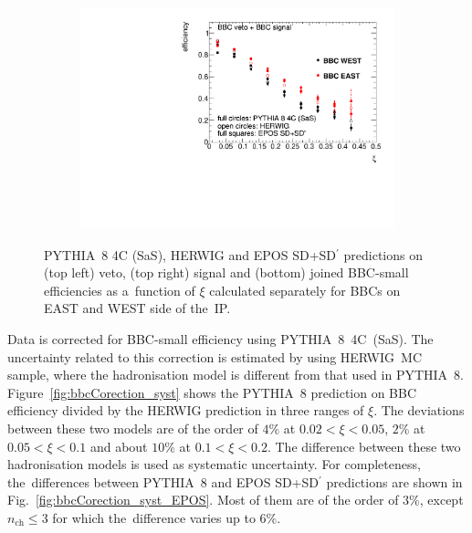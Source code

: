 \begin{figure}[t!]
\begin{subfigure}{.45\textwidth}
	\end{subfigure}
	\begin{subfigure}{.45\textwidth}
		\includegraphics[width=\textwidth,page=1]{chapters/chrgSTAR/img/bbcCorrection/xiSD_bbc.pdf}
	\end{subfigure}
	\begin{minipage}{.45\textwidth}
		\caption{PYTHIA~8 4C (SaS), HERWIG and EPOS SD+SD$^\prime$ predictions on  (top left) veto, (top right) signal and (bottom) joined BBC-small efficiencies  as a~function of  $\xi$ calculated separately for BBCs on EAST and WEST side of the~IP.}
		\label{fig:bbcAcceptance}
	\end{minipage}
	
\end{figure}

Data is corrected for BBC-small efficiency using PYTHIA~8~4C~(SaS).  The uncertainty related to this correction is  estimated by using HERWIG~MC sample, where the hadronisation model is different from that used in PYTHIA~8. Figure~\ref{fig:bbcCorection_syst} shows the PYTHIA~8  prediction on BBC efficiency  divided by the HERWIG prediction in three ranges of $\xi$. The deviations between these two models are of the order of $4\%$ at $0.02<\xi<0.05$, $2\%$ at $0.05<\xi<0.1$ and about $10\%$ at  $0.1<\xi<0.2$. The difference between these two hadronisation models is used as systematic uncertainty. For completeness, the~differences between PYTHIA~8 and EPOS SD+SD$^\prime$ predictions are shown in Fig.~\ref{fig:bbcCorection_syst_EPOS}. Most of them are of the order of $3\%$, except $n_\textrm{ch}\leq 3$ for which the~difference varies up to $6\%$.

